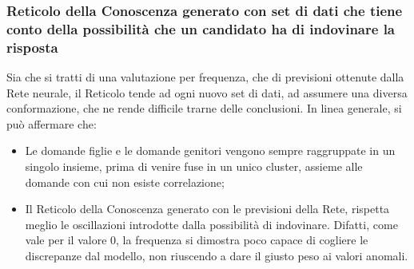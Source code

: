\subsubsection{Reticolo della Conoscenza generato con set di dati che tiene conto della possibilit\`a che un candidato ha di indovinare la risposta}
\label{Reticolo della Conoscenza generato con set di dati che tiene conto della possibilita che un candidato ha di indovinare la risposta}
Sia che si tratti di una valutazione per frequenza, che di previsioni ottenute dalla Rete neurale, il Reticolo tende ad ogni nuovo set di dati, ad assumere una diversa conformazione, che ne rende difficile trarne delle conclusioni.
In linea generale, si pu\`o affermare che:
\begin{itemize}
\item Le domande figlie e le domande genitori vengono sempre raggruppate in un singolo insieme, prima di venire fuse in un unico cluster, assieme alle domande con cui non esiste correlazione;
\item Il Reticolo della Conoscenza generato con le previsioni della Rete, rispetta meglio le oscillazioni introdotte dalla possibilit\`a di indovinare. Difatti, come vale per il valore 0, la frequenza si dimostra poco capace di cogliere le discrepanze dal modello, non riuscendo a dare il giusto peso ai valori anomali.
\end{itemize}

